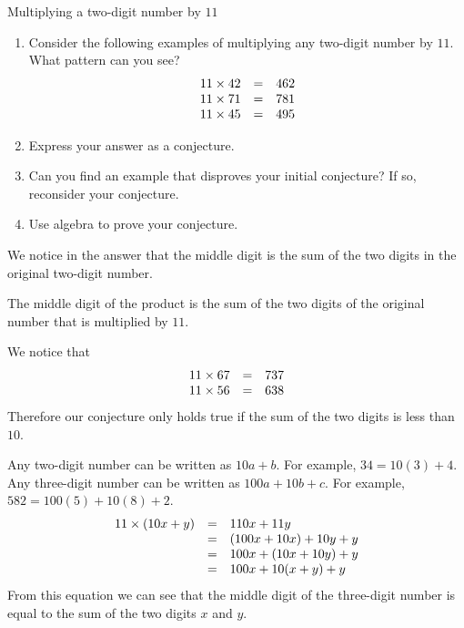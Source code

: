 \begin{wex}{Multiplying a two-digit number by $11$}
{
\begin{enumerate}[noitemsep, label=\textbf{\arabic*}. ] 
\item Consider the following examples of multiplying any two-digit number by $11$. What pattern can you see?
\begin{equation*}
    \begin{array}{ccc}\hfill 11 \times 42 &=& 462\\ 11 \times 71 &=& 781\\ 11 \times 45 &=& 495\end{array}
\end{equation*}

\item Express your answer as a conjecture.
\item Can you find an example that disproves your initial conjecture? If so, reconsider your conjecture.
\item Use algebra to prove your conjecture.
\end{enumerate}
}
{   
We notice in the answer that the middle digit is the sum of the two digits in the original two-digit number.

The middle digit of the product is the sum of the two digits of the original number that is multiplied by $11$.
   
We notice that 
\begin{equation*}
    \begin{array}{ccc}\hfill 11 \times 67 &=& 737\\ 11 \times 56 &=& 638\end{array}
\end{equation*}
Therefore our conjecture only holds true if the sum of the two digits is less than $10$.

Any two-digit number can be written as $10a+b$. For example, $34=
10(3)+4$. Any three-digit number can be written as $100a+10b+c$. For
example, $582=100(5)+ 10(8) +2$.
\begin{equation*}
    \begin{array}{ccl}\hfill 11 \times (10x+y) &=& 110x + 11y\\ &=&(100x + 10x) + 10y + y\\&=& 100x + (10x+ 10y) + y\\&=& 100x + 10(x+y) + y\end{array}
\end{equation*} 
From this equation we can see that the middle digit of the three-digit
number is equal to the sum of the two digits $x$ and $y$.
}
\end{wex}



